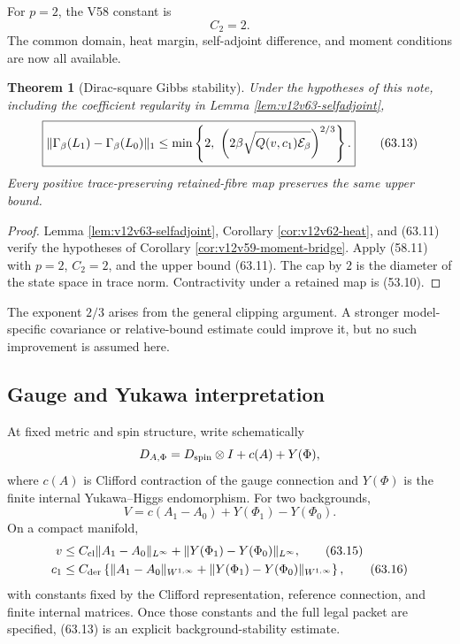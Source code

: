 \documentclass[11pt]{article}
\newtheorem{theorem}{Theorem}[section]
\theoremstyle{remark}
\begin{document}
For \(p=2\), the V58 constant is
\[
                         C_2=2.
\]
The common domain, heat margin, self-adjoint difference, and moment
conditions are now all available.

\begin{theorem}[Dirac-square Gibbs stability]
\label{thm:v12v63-Gibbs}
Under the hypotheses of this note, including the coefficient
regularity in Lemma \ref{lem:v12v63-selfadjoint},
\begin{equation}
 \boxed{
 \|\Gamma_\beta(L_1)-\Gamma_\beta(L_0)\|_1
 \leq
 \min\left\{
 2,\
 \left(2\beta
 \sqrt{Q(v,c_1){\cal E}_\beta}\right)^{2/3}
 \right\}.}                                      \tag{63.13}
\end{equation}
Every positive trace-preserving retained-fibre map preserves the
same upper bound.
\end{theorem}

\begin{proof}
Lemma \ref{lem:v12v63-selfadjoint}, Corollary
\ref{cor:v12v62-heat}, and (63.11) verify the hypotheses of
Corollary \ref{cor:v12v59-moment-bridge}.  Apply (58.11) with
\(p=2\), \(C_2=2\), and the upper bound (63.11).  The cap by \(2\)
is the diameter of the state space in trace norm.  Contractivity
under a retained map is (53.10).
\end{proof}

The exponent \(2/3\) arises from the general clipping argument.  A
stronger model-specific covariance or relative-bound estimate could
improve it, but no such improvement is assumed here.

\subsection{Gauge and Yukawa interpretation}

At fixed metric and spin structure, write schematically
\[
 D_{A,\Phi}
 =
 D_{\rm spin}\otimes I
 +
 c(A)
 +
 Y(\Phi),
\]
where \(c(A)\) is Clifford contraction of the gauge connection and
\(Y(\Phi)\) is the finite internal Yukawa--Higgs endomorphism.  For
two backgrounds,
\begin{equation}
 V
 =
 c(A_1-A_0)+Y(\Phi_1)-Y(\Phi_0).                  \tag{63.14}
\end{equation}
On a compact manifold,
\begin{align}
 v
 &\leq
 C_{\rm cl}\|A_1-A_0\|_{L^\infty}
 +
 \|Y(\Phi_1)-Y(\Phi_0)\|_{L^\infty},              \tag{63.15}\\
 c_1
 &\leq
 C_{\rm der}
 \left\{
 \|A_1-A_0\|_{W^{1,\infty}}
 +
 \|Y(\Phi_1)-Y(\Phi_0)\|_{W^{1,\infty}}
 \right\},                                        \tag{63.16}
\end{align}
with constants fixed by the Clifford representation, reference
connection, and finite internal matrices.  Once those constants and
the full legal packet are specified, (63.13) is an explicit
background-stability estimate.
\end{document}
